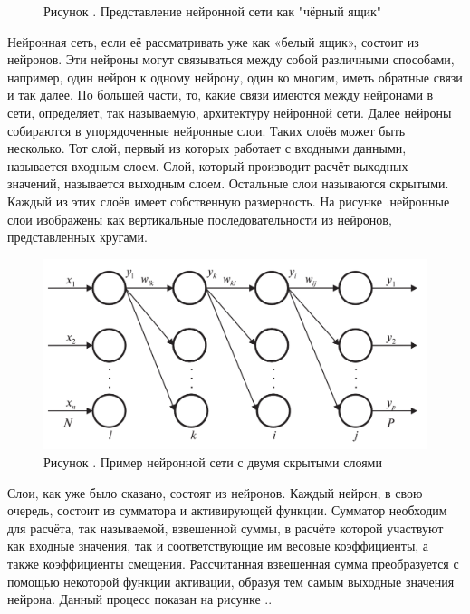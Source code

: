 {  \begin{figure}
    \centering
    \def\svgwidth{\textwidth}
    
    \caption*{\gostFont Рисунок \thechaptercntr .\theimagecntr \spc {--} Представление нейронной сети как "чёрный ящик"}
    \label{fig:NNBlackBox}
  \end{figure} \addtocounter{imagecntr}{1}

  \par \redline Нейронная сеть, если её рассматривать уже как «белый ящик», состоит из нейронов. Эти нейроны могут связываться между собой различными способами, например, один нейрон к одному нейрону, один ко многим, иметь обратные связи и так далее. По большей части, то, какие связи имеются между нейронами в сети, определяет, так называемую, архитектуру нейронной сети. Далее нейроны собираются в упорядоченные нейронные слои. Таких слоёв может быть несколько. Тот слой, первый из которых работает с входными данными, называется входным слоем. Слой, который производит расчёт выходных значений, называется выходным слоем. Остальные слои называются скрытыми. Каждый из этих слоёв имеет собственную размерность. На рисунке \thechaptercntr .\theimagecntr \spc нейронные слои изображены как вертикальные последовательности из нейронов, представленных кругами.

  \begin{figure}[H]
    \centering
    \def\svgwidth{\textwidth}
    \includegraphics[width=155mm]{images/NNWhiteBox.png}
    \caption*{\gostFont Рисунок \thechaptercntr .\theimagecntr \spc {--} Пример нейронной сети с двумя скрытыми слоями}
    \label{fig:NNWhiteBox}
  \end{figure} \addtocounter{imagecntr}{1}

  \par \redline Слои, как уже было сказано, состоят из нейронов. Каждый нейрон, в свою очередь, состоит из сумматора и активирующей функции. Сумматор необходим для расчёта, так называемой, взвешенной суммы, в расчёте которой участвуют как входные значения, так и соответствующие им весовые коэффициенты, а также коэффициенты смещения. Рассчитанная взвешенная сумма преобразуется с помощью некоторой функции активации, образуя тем самым выходные значения нейрона. Данный процесс показан на рисунке \thechaptercntr .\theimagecntr.

}
